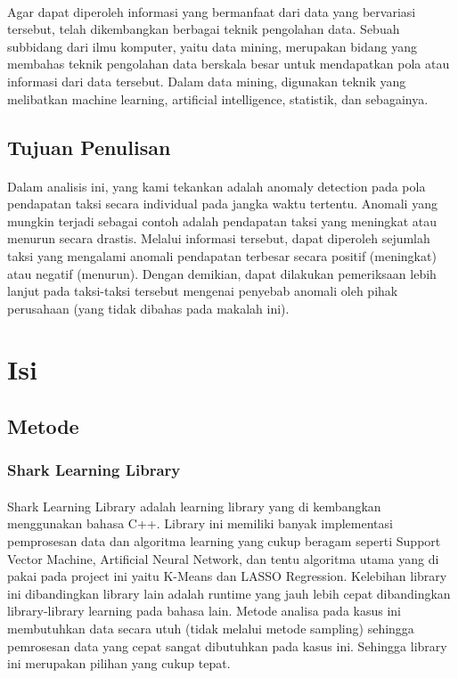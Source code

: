 \documentclass{article}
\begin{document}
\paragraph{}
Agar dapat diperoleh informasi yang bermanfaat dari data yang bervariasi tersebut, telah dikembangkan berbagai teknik pengolahan data. Sebuah subbidang dari ilmu komputer, yaitu data mining, merupakan bidang yang membahas teknik pengolahan data berskala besar untuk mendapatkan pola atau informasi dari data tersebut. Dalam data mining, digunakan teknik yang melibatkan machine learning, artificial intelligence, statistik, dan sebagainya.

\subsection{Tujuan Penulisan}

\paragraph{}
Dalam analisis ini, yang kami tekankan adalah anomaly detection pada pola pendapatan taksi secara individual pada jangka waktu tertentu. Anomali yang mungkin terjadi sebagai contoh adalah pendapatan taksi yang meningkat atau menurun secara drastis. Melalui informasi tersebut, dapat diperoleh sejumlah taksi yang mengalami anomali pendapatan terbesar secara positif (meningkat) atau negatif (menurun). Dengan demikian, dapat dilakukan pemeriksaan lebih lanjut pada taksi-taksi tersebut mengenai penyebab anomali oleh pihak perusahaan (yang tidak dibahas pada makalah ini).

\section{Isi}

\subsection{Metode}

\subsubsection{Shark Learning Library}

\paragraph{}
Shark Learning Library adalah learning library yang di kembangkan menggunakan bahasa C++. Library ini memiliki banyak implementasi pemprosesan data dan algoritma learning yang cukup beragam seperti Support Vector Machine, Artificial Neural Network, dan tentu algoritma utama yang di pakai pada project ini yaitu K-Means dan LASSO Regression. Kelebihan library ini dibandingkan library lain adalah runtime yang jauh lebih cepat dibandingkan library-library learning pada bahasa lain. Metode analisa pada kasus  ini membutuhkan data secara utuh (tidak melalui metode sampling) sehingga pemrosesan data yang cepat sangat dibutuhkan pada kasus ini. Sehingga library ini merupakan pilihan yang cukup tepat.
\end{document}
